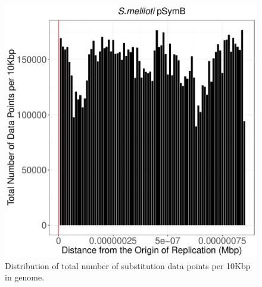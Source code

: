 \documentclass[12pt]{article}
\begin{document}
\begin{figure}
	\includegraphics[width=0.9\linewidth]{./pSymB_total_num_sites_graph.pdf}
	\caption{\label{fig:pb_tot_sites} Distribution of total number of substitution  data points per 10Kbp in genome.}
\end{figure}
\end{document}
